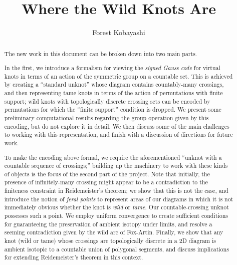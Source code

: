 \documentclass[math]{hmcthesis}
\title{Where the Wild Knots Are}
\author{Forest Kobayashi}
\begin{document}
\frontmatter

\maketitle



\begin{abstract}
  The new work in this document can be broken down into two main
  parts.

  In the first, we introduce a formalism for viewing the \emph{signed
    Gauss code} for virtual knots in terms of an action of the
  symmetric group on a countable set. This is achieved by creating a
  ``standard unknot'' whose diagram contains countably-many crossings,
  and then representing tame knots in terms of the action of
  permutations with finite support; wild knots with topologically
  discrete crossing sets can be encoded by permutations for which the
  ``finite support'' condition is dropped. We present some preliminary
  computational results regarding the group operation given by this
  encoding, but do not explore it in detail. We then discuss some of
  the main challenges to working with this representation, and finish
  with a discussion of directions for future work.

  To make the encoding above formal, we require the aforementioned
  ``unknot with a countable sequence of crossings;'' building up the
  machinery to work with these kinds of objects is the focus of the
  second part of the project. Note that initially, the presence of
  infinitely-many crossing might appear to be a contradiction to the
  finiteness constraint in Reidemeister's theorem; we show that this
  is not the case, and introduce the notion of \emph{feral points} to
  represent areas of our diagrams in which it is not immediately
  obvious whether the knot is \emph{wild} or \emph{tame}. Our
  countable-crossing unknot possesses such a point. We employ uniform
  convergence to create sufficient conditions for guaranteeing the
  preservation of ambient isotopy under limits, and resolve a seeming
  contradiction given by the wild arc of Fox-Artin. Finally, we show
  that any knot (wild or tame) whose crossings are topologically
  discrete in a 2D diagram is ambient isotopic to a countable union of
  polygonal segments, and discuss implications for extending
  Reidemeister's theorem in this context.
\end{abstract}

\tableofcontents
\listoffigures
\listoftables
\end{document}
